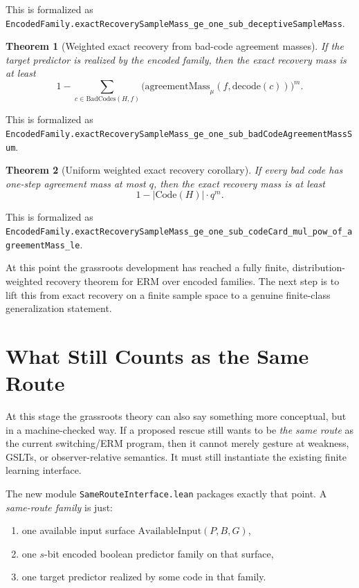 \documentclass[11pt]{article}
\newtheorem{theorem}{Theorem}[section]
\theoremstyle{remark}
\begin{document}
\noindent
This is formalized as
\texttt{EncodedFamily.exactRecoverySampleMass\_ge\_one\_sub\_deceptiveSampleMass}.

\begin{theorem}[Weighted exact recovery from bad-code agreement masses]
If the target predictor is realized by the encoded family, then the exact
recovery mass is at least
\[
  1 - \sum_{c \in \mathrm{BadCodes}(H,f)}
    \bigl(\mathrm{agreementMass}_{\mu}(f,\mathrm{decode}(c))\bigr)^m.
\]
\end{theorem}

\noindent
This is formalized as
\texttt{EncodedFamily.exactRecoverySampleMass\_ge\_one\_sub\_badCodeAgreementMassSum}.

\begin{theorem}[Uniform weighted exact recovery corollary]
If every bad code has one-step agreement mass at most \(q\), then the exact
recovery mass is at least
\[
  1 - |\mathrm{Code}(H)| \cdot q^m.
\]
\end{theorem}

\noindent
This is formalized as
\texttt{EncodedFamily.exactRecoverySampleMass\_ge\_one\_sub\_codeCard\_mul\_pow\_of\_agreementMass\_le}.

At this point the grassroots development has reached a fully finite,
distribution-weighted recovery theorem for ERM over encoded families.  The next
step is to lift this from exact recovery on a finite sample space to a genuine
finite-class generalization statement.

\section{What Still Counts as the Same Route}

At this stage the grassroots theory can also say something more conceptual, but
in a machine-checked way.  If a proposed rescue still wants to be \emph{the same
route} as the current switching/ERM program, then it cannot merely gesture at
weakness, GSLTs, or observer-relative semantics.  It must still instantiate the
existing finite learning interface.

The new module \texttt{SameRouteInterface.lean} packages exactly that point.  A
\emph{same-route family} is just:
\begin{enumerate}[leftmargin=1.5em]
  \item one available input surface \(\mathrm{AvailableInput}(P,B,G)\),
  \item one \(s\)-bit encoded boolean predictor family on that surface,
  \item one target predictor realized by some code in that family.
\end{enumerate}
\end{document}

